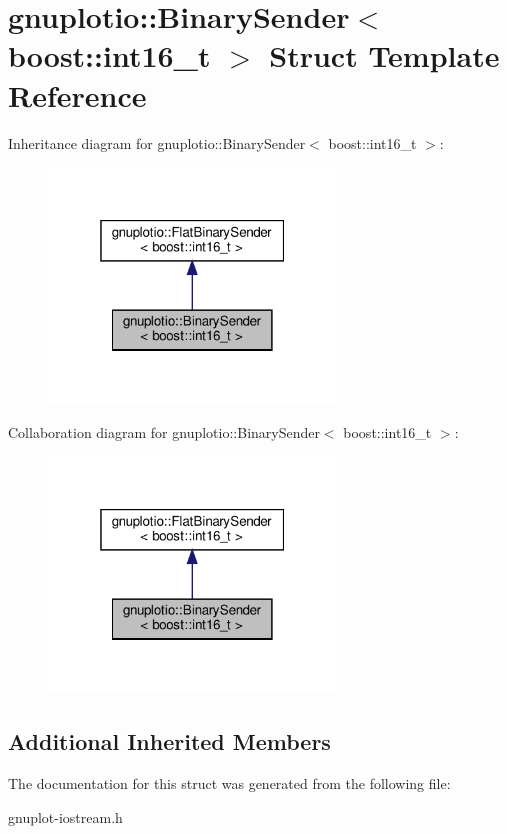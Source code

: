 \hypertarget{structgnuplotio_1_1BinarySender_3_01boost_1_1int16__t_01_4}{}\section{gnuplotio\+:\+:Binary\+Sender$<$ boost\+:\+:int16\+\_\+t $>$ Struct Template Reference}
\label{structgnuplotio_1_1BinarySender_3_01boost_1_1int16__t_01_4}


Inheritance diagram for gnuplotio\+:\+:Binary\+Sender$<$ boost\+:\+:int16\+\_\+t $>$\+:
\nopagebreak
\begin{figure}[H]
\begin{center}
\leavevmode
\includegraphics[width=217pt]{structgnuplotio_1_1BinarySender_3_01boost_1_1int16__t_01_4__inherit__graph}
\end{center}
\end{figure}


Collaboration diagram for gnuplotio\+:\+:Binary\+Sender$<$ boost\+:\+:int16\+\_\+t $>$\+:
\nopagebreak
\begin{figure}[H]
\begin{center}
\leavevmode
\includegraphics[width=217pt]{structgnuplotio_1_1BinarySender_3_01boost_1_1int16__t_01_4__coll__graph}
\end{center}
\end{figure}
\subsection*{Additional Inherited Members}


The documentation for this struct was generated from the following file\+:\begin{DoxyCompactItemize}
\item 
gnuplot-\/iostream.\+h\end{DoxyCompactItemize}
